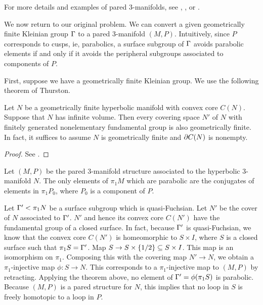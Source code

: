 For more details and examples of pared 3-manifolds, see \cite{CMc}, \cite{Mo},
or \cite{ThurstonI}.

We now return to our original problem. We can convert a given geometrically
finite Kleinian group $\Gamma$ to a pared 3-manifold $(M,P)$. Intuitively, since
$P$ corresponds to cusps, ie, parabolics, a surface subgroup of $\Gamma$ avoids
parabolic elements if and only if it avoids the peripheral subgroups associated
to components of $P$.

First, suppose we have a geometrically finite Kleinian group.  We use the
following theorem of Thurston.

\begin{thm}

Let $N$ be a geometrically finite hyperbolic manifold with convex core $C(N)$.
Suppose that $N$ has infinite volume. Then every covering space $N'$ of $N$
with finitely generated nonelementary fundamental group is also geometrically
finite. In fact, it suffices to assume $N$ is geometrically finite and $\partial
C(N)$ is nonempty.


\end{thm}

\begin{proof}

See \cite{Mo}. %

\end{proof}


Let $(M,P)$ be the pared 3-manifold structure associated to the hyperbolic
3-manifold $N$. The only elements of $\pi_1M$ which are parabolic are the
conjugates of elements in $\pi_1P_0$, where $P_0$ is a component of $P$.

Let $\Gamma' < \pi_1N$ be a surface subgroup which is quasi-Fuchsian. Let $N'$ be
the cover of $N$ associated to $\Gamma'$. $N'$ and hence its convex core $C(N')$
have the fundamental group of a closed surface. In fact, because $\Gamma'$ is
quasi-Fuchsian, we know that the convex core $C(N')$ is homeomorphic to $S
\times I$, where $S$ is a closed surface such that $\pi_1S = \Gamma'$.  Map $S \to
S \times \{1/2\} \subseteq S \times I$. This map is an isomorphism on $\pi_1$.
Composing this with the covering map $N' \to N$, we obtain a $\pi_1$-injective
map $\phi \colon S \to N$.  This corresponds to a $\pi_1$-injective map to
$(M,P)$ by retracting.  Applying the theorem above, no element of
$\Gamma'=\phi(\pi_1S)$ is parabolic.  Because $(M,P)$ is a pared structure for
$N$, this implies that no loop in $S$ is freely homotopic to a loop in $P$.

